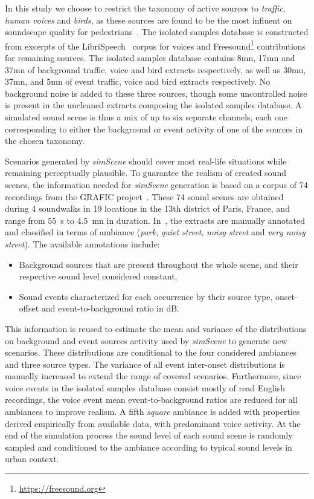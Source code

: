 \documentclass[twocolumn]{article}
\begin{document}
In this study we choose to restrict the taxonomy of active sources to \textit{traffic}, \textit{human voices} and \textit{birds}, as these sources are found to be the most influent on soundscape quality for pedestrians~\cite{lavandier2006}. The isolated samples database is constructed from excerpts of the LibriSpeech~\cite{panayotov2015} corpus for voices and Freesound\footnote{\url{https://freesound.org}} contributions for remaining sources. The isolated samples database contains 8mn, 17mn and 37mn of background traffic, voice and bird extracts respectively, as well as 30mn, 37mn, and 5mn of event traffic, voice and bird extracts respectively. No background noise is added to these three sources, though some uncontrolled noise is present in the uncleaned extracts composing the isolated samples database. A simulated sound scene is thus a mix of up to six separate channels, each one corresponding to either the background or event activity of one of the sources in the chosen taxonomy.

Scenarios generated by \textit{simScene} should cover most real-life situations while remaining perceptually plausible. To guarantee the realism of created sound scenes, the information needed for \textit{simScene} generation is based on a corpus of 74 recordings from the GRAFIC project~\cite{aumond2017}. These 74 sound scenes are obtained during 4 soundwalks in 19 locations in the 13th district of Paris, France, and range from 55~s to 4.5~mn in duration. In~\cite{gloaguen2017}, the extracts are manually annotated and classified in terms of ambiance (\textit{park}, \textit{quiet street}, \textit{noisy street} and \textit{very noisy street}). The available annotations include:

\begin{itemize}
\item Background sources that are present throughout the whole scene, and their respective sound level considered constant,
\item Sound events characterized for each occurrence by their source type, onset-offset and event-to-background ratio in dB.
\end{itemize}

This information is reused to estimate the mean and variance of the distributions on background and event sources activity used by \textit{simScene} to generate new scenarios. These distributions are conditional to the four considered ambiances and three source types. The variance of all event inter-onset distributions is manually increased to extend the range of covered scenarios. Furthermore, since voice events in the isolated samples database consist mostly of read English recordings, the voice event mean event-to-background ratios are reduced for all ambiances to improve realism. A fifth \textit{square} ambiance is added with properties derived empirically from available data, with predominant voice activity. At the end of the simulation process the sound level of each sound scene is randomly sampled and conditioned to the ambiance according to typical sound levels in urban context.
\end{document}
